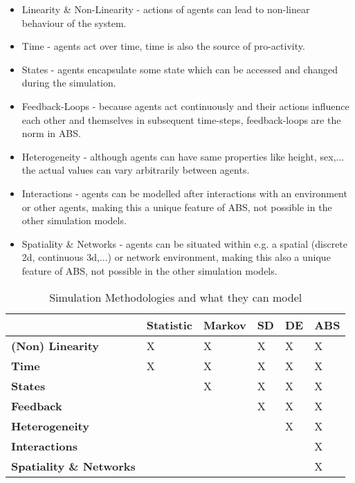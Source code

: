 \begin{itemize}
	\item Linearity \& Non-Linearity - actions of agents can lead to non-linear behaviour of the system.
	\item Time - agents act over time, time is also the source of pro-activity.
	\item States - agents encapsulate some state which can be accessed and changed during the simulation.
	\item Feedback-Loops - because agents act continuously and their actions influence each other and themselves in subsequent time-steps, feedback-loops are the norm in ABS. 
	\item Heterogeneity - although agents can have same properties like height, sex,... the actual values can vary arbitrarily between agents.
	\item Interactions - agents can be modelled after interactions with an environment or other agents, making this a unique feature of ABS, not possible in the other simulation models.
	\item Spatiality \& Networks - agents can be situated within e.g. a spatial (discrete 2d, continuous 3d,...) or network environment, making this also a unique feature of ABS, not possible in the other simulation models.
\end{itemize}

\begin{table*}[t]
\centering
\caption{Simulation Methodologies and what they can model}
\label{tab:simulation_types}
\begin{tabular}{l || l | l | l | l | l }
	 			& \textbf{Statistic} & \textbf{Markov} & \textbf{SD} & \textbf{DE} & \textbf{ABS} \\ \hline \hline

\textbf{(Non) Linearity}		& X	& X	& X	& X	& X \\  
\textbf{Time}					& X	& X	& X	& X	& X \\  
\textbf{States}					& 	& X	& X	& X	& X \\   
\textbf{Feedback}				& 	& 	& X	& X	& X \\  
\textbf{Heterogeneity}			& 	& 	& 	& X	& X \\  
\textbf{Interactions}			& 	& 	& 	& 	& X \\  
\textbf{Spatiality \& Networks}	& 	& 	& 	& 	& X \\  
\end{tabular}
\end{table*}